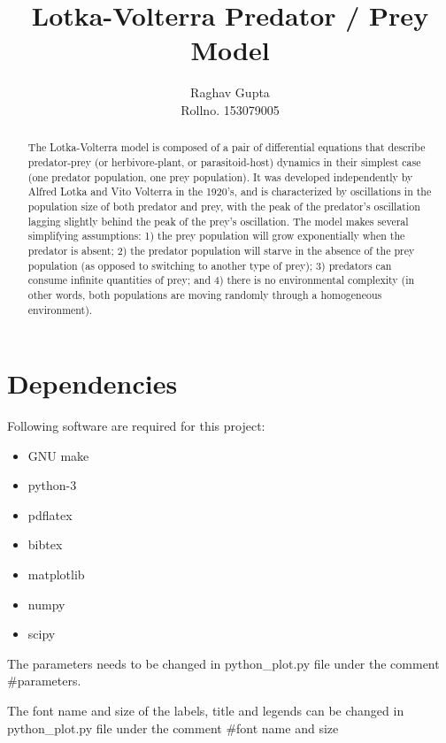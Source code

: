 \documentclass{article}
\title{Lotka-Volterra Predator / Prey Model}
\author{Raghav Gupta \\
	Rollno. 153079005}
\begin{document}


\maketitle
\newpage
\tableofcontents
\newpage
\listoffigures
\newpage

\begin{abstract}
The Lotka-Volterra model is composed of a pair of differential equations that describe predator-prey (or herbivore-plant, or parasitoid-host) dynamics in their simplest case (one predator population, one prey population). It was developed independently by Alfred Lotka and Vito Volterra in the 1920's, and is characterized by oscillations in the population size of both predator and prey, with the peak of the predator's oscillation lagging slightly behind the peak of the prey's oscillation. The model makes several simplifying assumptions: 1) the prey population will grow exponentially when the predator is absent; 2) the predator population will starve in the absence of the prey population (as opposed to switching to another type of prey); 3) predators can consume infinite quantities of prey; and 4) there is no environmental complexity (in other words, both populations are moving randomly through a homogeneous environment).
\end{abstract}

\newpage
\section{Dependencies}

Following software are required for this project:

\begin{itemize}

\item GNU make
\item python-3
\item pdflatex
\item bibtex
\item matplotlib
\item numpy
\item scipy

\end{itemize}

The parameters needs to be changed in python\_plot.py file under the comment \#parameters.

The font name and size of the labels, title and legends can be changed in python\_plot.py file under the  comment \#font name and size 
\end{document}
